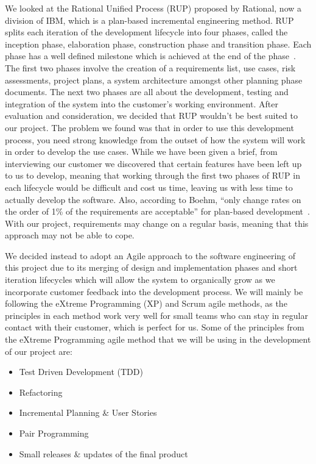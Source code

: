 We looked at the Rational Unified Process (RUP) proposed by Rational, now a division of IBM, which is a plan-based incremental engineering method.
RUP splits each iteration of the development lifecycle into four phases, called the inception phase, elaboration phase, construction phase and transition phase.
Each phase has a well defined milestone which is achieved at the end of the phase~\cite{rup1998}.
The first two phases involve the creation of a requirements list, use cases, risk assessments, project plans, a system architecture amongst other planning phase documents.
The next two phases are all about the development, testing and integration of the system into the customer’s working environment.
After evaluation and consideration, we decided that RUP wouldn’t be best suited to our project.
The problem we found was that in order to use this development process, you need strong knowledge from the outset of how the system will work in order to develop the use cases.
While we have been given a brief, from interviewing our customer we discovered that certain features have been left up to us to develop, meaning that working through the first two phases of RUP in each lifecycle would be difficult and cost us time, leaving us with less time to actually develop the software.
Also, according to Boehm, “only change rates on the order of 1\% of the requirements are acceptable” for plan-based development~\cite[p 31]{boehm2003balancing}.
With our project, requirements may change on a regular basis, meaning that this approach may not be able to cope.

We decided instead to adopt an Agile approach to the software engineering of this project due to its merging of design and implementation phases and short iteration lifecycles which will allow the system to organically grow as we incorporate customer feedback into the development process. We will mainly be following the eXtreme Programming (XP) and Scrum agile methods, as the principles in each method work very well for small teams who can stay in regular contact with their customer, which is perfect for us. Some of the principles from the eXtreme Programming agile method that we will be using in the development of our project are:
\begin{itemize}
	\item Test Driven Development (TDD)
	\item Refactoring
	\item Incremental Planning \& User Stories
	\item Pair Programming
	\item Small releases \& updates of the final product~\cite{sommerville2016software}
\end{itemize}

